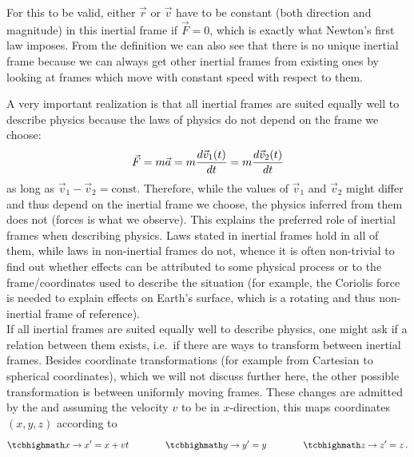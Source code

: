 \documentclass[../relativity_main.tex]{subfiles}
\begin{document}
For this to be valid, either $\vec{r}$ or $\vec{v}$ have to be constant (both direction and magnitude) in this inertial frame if $\vec{F} = 0$, which is exactly what Newton's first law imposes. From the definition we can also see that there is no unique inertial frame because we can always get other inertial frames from existing ones by looking at frames which move with constant speed with respect to them.

A very important realization is that all inertial frames are suited equally well to describe physics because the laws of physics do not depend on the frame we choose:
\begin{equation}
	\vec{F} = m \vec{a} = m \dv{\vec{v}_1(t)}{t} = m \dv{\vec{v}_2(t)}{t}
\end{equation}
as long as $\vec{v}_1 - \vec{v}_2 = \text{const}$. Therefore, while the values of $\vec{v}_1$ and $\vec{v}_2$ might differ and thus depend on the inertial frame we choose, the physics inferred from them does not (forces is what we observe). This explains the preferred role of inertial frames when describing physics. Laws stated in inertial frames hold in all of them, while laws in non-inertial frames do not, whence it is often non-trivial to find out whether effects can be attributed to some physical process or to the frame/coordinates used to describe the situation (for example, the Coriolis force is needed to explain effects on Earth's surface, which is a rotating and thus non-inertial frame of reference).\\


If all inertial frames are suited equally well to describe physics, one might ask if a relation between them exists, i.e.~if there are ways to transform between inertial frames. Besides coordinate transformations (for example from Cartesian to spherical coordinates), which we will not discuss further here, the other possible transformation is between uniformly moving frames. These changes are admitted by the  and assuming the velocity $v$ to be in $x$-direction, this maps coordinates $(x, y, z)$ according to
\begin{equation}\label{eq:galilei}
	\eqbox{
	x \rightarrow x' = x + v t
	}
	\qquad \qquad
	\eqbox{
	y \rightarrow y' = y
	}
	\qquad \qquad
	\eqbox{
	z \rightarrow z' = z
	} \, .
\end{equation}
\end{document}
